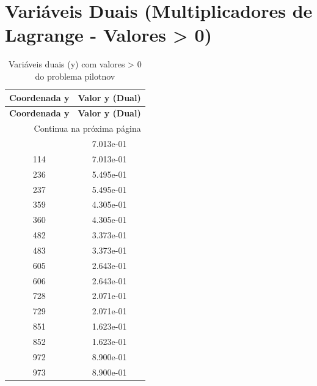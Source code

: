 \documentclass[12pt]{article}
\begin{document}
\section{Variáveis Duais (Multiplicadores de Lagrange - Valores > 0)}

\begin{longtable}{@{}cc@{}}
\caption{Variáveis duais (y) com valores > 0 do problema pilotnov} \\
\toprule
\textbf{Coordenada y} & \textbf{Valor y (Dual)} \\
\midrule
\endfirsthead

\toprule
\textbf{Coordenada y} & \textbf{Valor y (Dual)} \\
\midrule
\endhead

\midrule \multicolumn{2}{r}{{Continua na próxima página}} \\ \midrule
\endfoot

\bottomrule
\endlastfoot
113 & 7.013e-01 \\
114 & 7.013e-01 \\
236 & 5.495e-01 \\
237 & 5.495e-01 \\
359 & 4.305e-01 \\
360 & 4.305e-01 \\
482 & 3.373e-01 \\
483 & 3.373e-01 \\
605 & 2.643e-01 \\
606 & 2.643e-01 \\
728 & 2.071e-01 \\
729 & 2.071e-01 \\
851 & 1.623e-01 \\
852 & 1.623e-01 \\
972 & 8.900e-01 \\
973 & 8.900e-01 \\

\bottomrule
\end{longtable}
\end{document}
